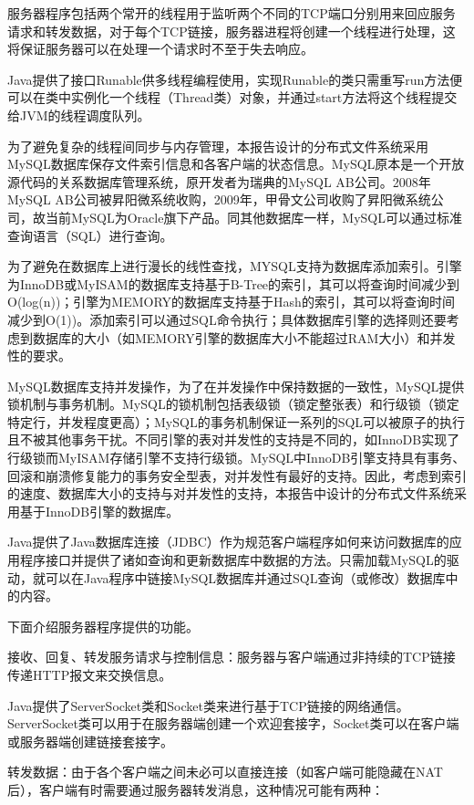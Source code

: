 服务器程序包括两个常开的线程用于监听两个不同的TCP端口分别用来回应服务请求和转发数据，对于每个TCP链接，服务器进程将创建一个线程进行处理，这将保证服务器可以在处理一个请求时不至于失去响应。

Java提供了接口Runable供多线程编程使用，实现Runable的类只需重写run方法便可以在类中实例化一个线程（Thread类）对象，并通过start方法将这个线程提交给JVM的线程调度队列。

为了避免复杂的线程间同步与内存管理，本报告设计的分布式文件系统采用MySQL数据库保存文件索引信息和各客户端的状态信息。MySQL原本是一个开放源代码的关系数据库管理系统，原开发者为瑞典的MySQL AB公司。2008年MySQL AB公司被昇阳微系统收购，2009年，甲骨文公司收购了昇阳微系统公司，故当前MySQL为Oracle旗下产品。同其他数据库一样，MySQL可以通过标准查询语言（SQL）进行查询。

为了避免在数据库上进行漫长的线性查找，MYSQL支持为数据库添加索引。引擎为InnoDB或MyISAM的数据库支持基于B-Tree的索引，其可以将查询时间减少到O(log(n))；引擎为MEMORY的数据库支持基于Hash的索引，其可以将查询时间减少到O(1))。添加索引可以通过SQL命令执行；具体数据库引擎的选择则还要考虑到数据库的大小（如MEMORY引擎的数据库大小不能超过RAM大小）和并发性的要求。

MySQL数据库支持并发操作，为了在并发操作中保持数据的一致性，MySQL提供锁机制与事务机制。MySQL的锁机制包括表级锁（锁定整张表）和行级锁（锁定特定行，并发程度更高）；MySQL的事务机制保证一系列的SQL可以被原子的执行且不被其他事务干扰。不同引擎的表对并发性的支持是不同的，如InnoDB实现了行级锁而MyISAM存储引擎不支持行级锁。MySQL中InnoDB引擎支持具有事务、回滚和崩溃修复能力的事务安全型表，对并发性有最好的支持。因此，考虑到索引的速度、数据库大小的支持与对并发性的支持，本报告中设计的分布式文件系统采用基于InnoDB引擎的数据库。

Java提供了Java数据库连接（JDBC）作为规范客户端程序如何来访问数据库的应用程序接口并提供了诸如查询和更新数据库中数据的方法。只需加载MySQL的驱动，就可以在Java程序中链接MySQL数据库并通过SQL查询（或修改）数据库中的内容。

下面介绍服务器程序提供的功能。

接收、回复、转发服务请求与控制信息：服务器与客户端通过非持续的TCP链接传递HTTP报文来交换信息。

Java提供了ServerSocket类和Socket类来进行基于TCP链接的网络通信。ServerSocket类可以用于在服务器端创建一个欢迎套接字，Socket类可以在客户端或服务器端创建链接套接字。

转发数据：由于各个客户端之间未必可以直接连接（如客户端可能隐藏在NAT后），客户端有时需要通过服务器转发消息，这种情况可能有两种：

